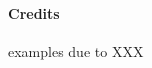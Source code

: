 \documentclass[11pt,a4paper]{article}
\newtheorem{exercise}{Exercise}
\begin{document}
	
%
%	
%	
	
	
	

	
\paragraph{Credits} examples due to XXX
		
\end{document}
